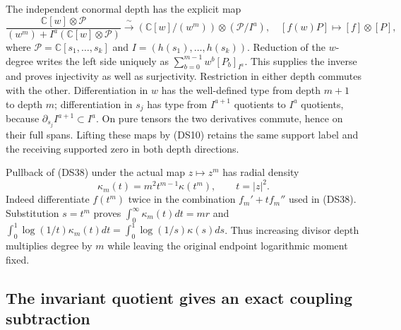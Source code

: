 The independent conormal depth has the explicit map
\[
 \frac{\mathbb C[w]\otimes\mathcal P}
 {(w^m)+I^a(\mathbb C[w]\otimes\mathcal P)}
 \xrightarrow{\ \sim\ }
 (\mathbb C[w]/(w^m))\otimes(\mathcal P/I^a),
 \quad [f(w)P]\mapsto[f]\otimes[P],
 \tag{DS51}
\]
where $\mathcal P=\mathbb C[s_1,\ldots,s_k]$ and
$I=(h(s_1),\ldots,h(s_k))$.  Reduction of the $w$-degree writes
the left side uniquely as $\sum_{b=0}^{m-1}w^b[P_b]_{I^a}$.
This supplies the inverse and proves injectivity as well as
surjectivity.  Restriction in either depth commutes with the other.
Differentiation in $w$ has the well-defined type from depth $m+1$
to depth $m$; differentiation in $s_j$ has type from $I^{a+1}$
quotients to $I^a$ quotients, because
$\partial_{s_j}I^{a+1}\subset I^a$.  On pure tensors the two
derivatives commute, hence on their full spans.  Lifting these maps
by (DS10) retains the same support label and the receiving supported
zero in both depth directions.

Pullback of (DS38) under the actual map $z\mapsto z^m$ has radial
density
\[
 \kappa_m(t)=m^2t^{m-1}\kappa(t^m),\qquad t=|z|^2.
 \tag{DS52}
\]
Indeed differentiate $f(t^m)$ twice in the combination
$f_m'+tf_m''$ used in (DS38).  Substitution $s=t^m$ proves
$\int_0^\infty\kappa_m(t)dt=mr$ and
$\int_0^1\log(1/t)\kappa_m(t)dt
=\int_0^1\log(1/s)\kappa(s)ds$.
Thus increasing divisor depth multiplies degree by $m$ while
leaving the original endpoint logarithmic moment fixed.

\subsection{The invariant quotient gives an exact coupling subtraction}

